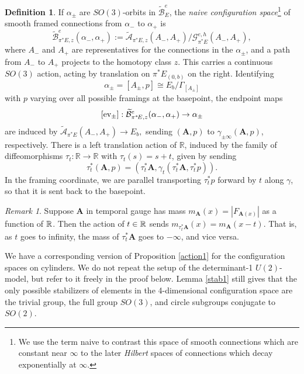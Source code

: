 \documentclass{memo-l}
\newcommand{\pE}{\pi^* \! E}
\theoremstyle{definition}
\newtheorem{definition}[theorem]{Definition}
\theoremstyle{remark}
\newtheorem{remark}[theorem]{Remark}
\numberwithin{section}{chapter}
\numberwithin{equation}{chapter}
\begin{document}
\begin{definition}\label{naiveconf}If $\alpha_\pm$ are $SO(3)$-orbits in $\widetilde{\mathcal B}^e_E$, the \textit{naive configuration space}\footnote{We use the term naive to contrast this space of smooth connections which are constant near $\infty$ to the later \textit{Hilbert} spaces of connections which decay exponentially at $\infty$.} of smooth framed connections from $\alpha_-$ to $\alpha_+$ is 
$$\widetilde{\mathcal B}^e_{\pE,z}(\alpha_-, \alpha_+) := \widetilde{\mathcal A}_{\pE,z}(A_-, A_+) / \mathcal G^{e,h}_{\pE}(A_-, A_+),$$ 
where $A_-$ and $A_+$ are representatives for the connections in the $\alpha_\pm$, and a path from $A_-$ to $A_+$ projects to the homotopy class $z$. This carries a continuous $SO(3)$ action, acting by translation on $\pE_{(0,b)}$ on the right. Identifying 
$$\alpha_\pm = [A_\pm, p] \cong E_b/\Gamma_{[A_\pm]}$$ 
with $p$ varying over all possible framings at the basepoint, the endpoint maps 
$$[\textup{ev}_{\pm}]: \widetilde{\mathcal B}^e_{\pE,z}(\alpha_-, \alpha_+) \to \alpha_\pm$$ 
are induced by $\widetilde{\mathcal A}_{\pE}(A_-, A_+) \to E_b,$ sending $(\mathbf{A}, p)$ to $\gamma_{\pm \infty}(\mathbf{A}, p)$, respectively. There is a left translation action of $\mathbb R$, induced by the family of diffeomorphisms $\tau_t: \mathbb R \to \mathbb R$ with $\tau_t(s) = s+t$, given by sending $$\tau_t^*(\mathbf{A}, p) = (\tau_t^* \mathbf{A}, \gamma_t(\tau_t^*\mathbf{A}, \tau_t^*p)).$$ In the framing coordinate, we are parallel transporting $\tau_t^*p$ forward by $t$ along $\gamma$, so that it is sent back to the basepoint.
\end{definition}

\begin{remark}\label{rmk:t-action}
Suppose $\mathbf{A}$ in temporal gauge has mass $m_{\mathbf A}(x) = |F_{\mathbf{A}(x)}|$ as a function of $\Bbb R$. Then the action of $t \in \Bbb R$ sends $m_{\tau_t^* \mathbf A}(x) = m_{\mathbf A}(x - t)$. That is, as $t$ goes to infinity, the mass of $\tau_t^* \mathbf{A}$ goes to $-\infty$, and vice versa.
\end{remark}

We have a corresponding version of Proposition \ref{action1} for the configuration spaces on cylinders. We do not repeat the setup of the determinant-1 $U(2)$-model, but refer to it freely in the proof below. Lemma \ref{stab1} still gives that the only possible stabilizers of elements in the 4-dimensional configuration space are the trivial group, the full group $SO(3)$, and circle subgroups conjugate to $SO(2)$.
\end{document}
